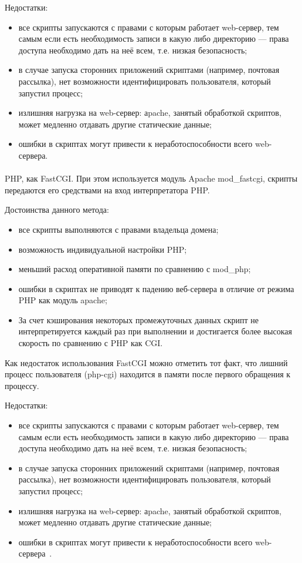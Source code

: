 Недостатки:
\begin{itemize}
\item все скрипты запускаются с правами с которым работает web-сервер, 
  тем самым если есть необходимость записи в какую либо директорию --- права доступа необходимо дать на неё всем,
  т.е. низкая безопасность;
\item
  в случае запуска сторонних приложений скриптами (например, почтовая рассылка), нет возможности идентифицировать пользователя,
  который запустил процесс;
\item
  излишняя нагрузка на web-сервер: аpache, занятый обработкой скриптов, может медленно отдавать другие статические данные;
\item
  ошибки в скриптах могут привести к неработоспособности всего web-сервера.
\end{itemize}

\paragraph{}
PHP, как FastCGI. При этом используется модуль Apache mod\_fastcgi,
скрипты передаются его средствами на вход интерпретатора PHP.

Достоинства данного метода:
\begin{itemize}
\item
  все скрипты выполняются с правами владельца домена;
\item
  возможность индивидуальной настройки PHP;
\item
  меньший расход оперативной памяти по сравнению с mod\_php;
\item
  ошибки в скриптах не приводят к падению веб-сервера в отличие от режима PHP как модуль apache;
\item
  За счет кэширования некоторых промежуточных данных скрипт не интерпретируется каждый раз при выполнении
  и достигается более высокая скорость по сравнению с PHP как CGI.
\end{itemize}

Как недостаток использования FastCGI можно отметить тот факт, что лишний процесс пользователя (php-cgi)
находится в памяти после первого обращения к процессу.

Недостатки:
\begin{itemize}
\item все скрипты запускаются с правами с которым работает web-сервер, 
  тем самым если есть необходимость записи в какую либо директорию --- права доступа необходимо дать на неё всем,
  т.е. низкая безопасность;
\item
  в случае запуска сторонних приложений скриптами (например, почтовая рассылка),
  нет возможности идентифицировать пользователя, который запустил процесс;
\item
  излишняя нагрузка на web-сервер: аpache, занятый обработкой скриптов, может медленно отдавать другие статические данные;
\item
  ошибки в скриптах могут привести к неработоспособности всего web-сервера~\cite{komtet_php_conf}.
\end{itemize}

